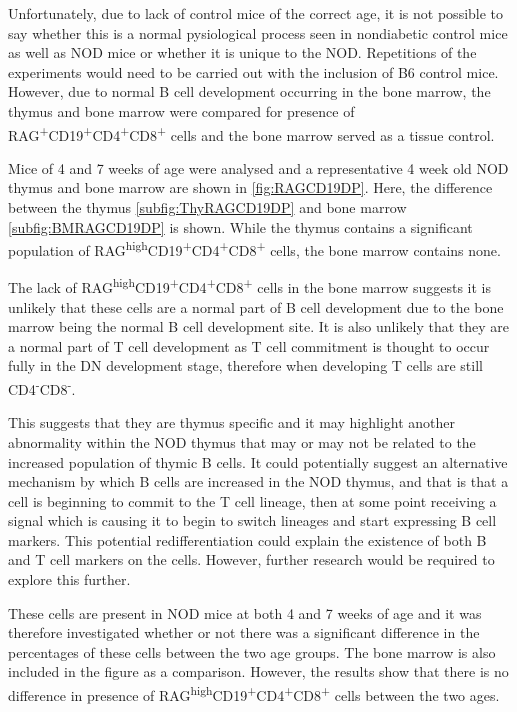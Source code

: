 Unfortunately, due to lack of control mice of the correct age, it is not possible to say whether this is a normal pysiological process seen in nondiabetic control mice as well as NOD mice or whether it is unique to the NOD.
Repetitions of the experiments would need to be carried out with the inclusion of B6 control mice.
However, due to normal B cell development occurring in the bone marrow, the thymus and bone marrow were compared for presence of RAG\textsuperscript{+}CD19\textsuperscript{+}CD4\textsuperscript{+}CD8\textsuperscript{+} cells and the bone marrow served as a tissue control.

Mice of 4 and 7 weeks of age were analysed and a representative 4 week old NOD thymus and bone marrow are shown in \cref{fig:RAGCD19DP}. 
Here, the difference between the thymus \cref{subfig:ThyRAGCD19DP} and bone marrow \cref{subfig:BMRAGCD19DP} is shown.
While the thymus contains a significant population of RAG\textsuperscript{high}CD19\textsuperscript{+}CD4\textsuperscript{+}CD8\textsuperscript{+} cells, the bone marrow contains none.

The lack of RAG\textsuperscript{high}CD19\textsuperscript{+}CD4\textsuperscript{+}CD8\textsuperscript{+} cells in the bone marrow suggests it is unlikely that these cells are a normal part of B cell development due to the bone marrow being the normal B cell development site.
It is also unlikely that they are a normal part of T cell development as T cell commitment is thought to occur fully in the DN development stage, therefore when developing T cells are still CD4\textsuperscript{-}CD8\textsuperscript{-}.


This suggests that they are thymus specific and it may highlight another abnormality within the NOD thymus that may or may not be related to the increased population of thymic B cells.
It could potentially suggest an alternative mechanism by which B cells are increased in the NOD thymus, and that is that a cell is beginning to commit to the T cell lineage, then at some point receiving a signal which is causing it to begin to switch lineages and start expressing B cell markers.
This potential redifferentiation could explain the existence of both B and T cell markers on the cells. 
However, further research would be required to explore this further.

These cells are present in NOD mice at both 4 and 7 weeks of age and it was therefore investigated whether or not there was a significant difference in the percentages of these cells between the two age groups. 
The bone marrow is also included in the figure as a comparison.
However, the results show that there is no difference in presence of RAG\textsuperscript{high}CD19\textsuperscript{+}CD4\textsuperscript{+}CD8\textsuperscript{+} cells between the two ages.



